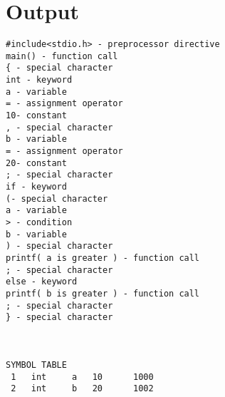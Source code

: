 \documentclass[11pt]{article}
\begin{document}
\section{Output}
\label{sec-2}
\begin{verbatim}
#include<stdio.h> - preprocessor directive
main() - function call
{ - special character
int - keyword
a - variable
= - assignment operator
10- constant
, - special character
b - variable
= - assignment operator
20- constant
; - special character
if - keyword
(- special character
a - variable
> - condition
b - variable
) - special character
printf( a is greater ) - function call
; - special character
else - keyword
printf( b is greater ) - function call
; - special character
} - special character



SYMBOL TABLE
 1 	 int 	 a 	 10 	 1000
 2 	 int 	 b 	 20 	 1002
\end{verbatim}
\end{document}
